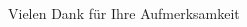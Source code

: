 \STANDARD{}
{
  \begin{columns}
    \begin{column}{0.35\textwidth}
      \begin{block}{~~~~~~Vielen Dank}
        \centering
        für Ihre Aufmerksamkeit
      \end{block}
    \end{column}
  \end{columns}
}



